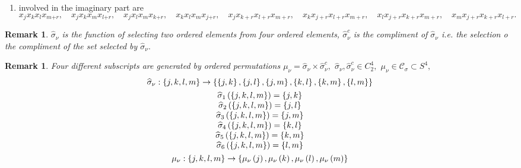 \documentclass[aps,preprint]{revtex4}%
\newtheorem{remark}[theorem]{Remark}
\begin{document}
\begin{enumerate}
\item involved in the imaginary part are%
\begin{equation}
x_{j}x_{k}x_{l}x_{m\boldsymbol{+}r},\quad x_{j}x_{k}x_{m}x_{l\boldsymbol{+}%
r},\quad x_{j}x_{l}x_{m}x_{k\boldsymbol{+}r},\quad x_{k}x_{l}x_{m}%
x_{j\boldsymbol{+}r},\quad x_{j}x_{k+r}x_{l+r}x_{m+r},\quad x_{k}%
x_{j+r}x_{l+r}x_{m+r},\quad x_{l}x_{j+r}x_{k+r}x_{m+r},\quad x_{m}%
x_{j+r}x_{k+r}x_{l+r}.
\end{equation}

\end{enumerate}

\begin{remark}
$\widehat{\sigma}_{\nu}$ is the function of selecting two ordered elements
from four ordered elements, $\widehat{\sigma}_{\nu}^{c}$ is the compliment of
$\widehat{\sigma}_{\nu}$ i.e. the selection o the compliment of the set
selected by $\widehat{\sigma}_{\nu}.$
\end{remark}

\begin{remark}
\newline Four different subscripts are generated by ordered permutations
$\mu_{\nu}=\widehat{\sigma}_{\nu}\times\widehat{\sigma}_{\nu}^{c},$
$\widehat{\sigma}_{\nu},\widehat{\sigma}_{\nu}^{c}\in C_{2}^{4},$ $\mu_{\nu
}\in\mathcal{C}_{\sigma}\subset S^{4},$%
\begin{gather}
\widehat{\sigma}_{\nu}:\left\{  j,k,l,m\right\}  \rightarrow\left\{  \left\{
j,k\right\}  ,\left\{  j,l\right\}  ,\left\{  j,m\right\}  ,\left\{
k,l\right\}  ,\left\{  k,m\right\}  ,\left\{  l,m\right\}  \right\} \\%
\begin{array}
[c]{c}%
\widehat{\sigma}_{1}\left(  \left\{  j,k,l,m\right\}  \right)  =\left\{
j,k\right\} \\
\widehat{\sigma}_{2}\left(  \left\{  j,k,l,m\right\}  \right)  =\left\{
j,l\right\} \\
\widehat{\sigma}_{3}\left(  \left\{  j,k,l,m\right\}  \right)  =\left\{
j,m\right\} \\
\widehat{\sigma}_{4}\left(  \left\{  j,k,l,m\right\}  \right)  =\left\{
k,l\right\} \\
\widehat{\sigma}_{5}\left(  \left\{  j,k,l,m\right\}  \right)  =\left\{
k,m\right\} \\
\widehat{\sigma}_{6}\left(  \left\{  j,k,l,m\right\}  \right)  =\left\{
l,m\right\}
\end{array}
\\
\mu_{\nu}:\left\{  j,k,l,m\right\}  \rightarrow\left\{  \mu_{\nu}\left(
j\right)  ,\mu_{\nu}\left(  k\right)  ,\mu_{\nu}\left(  l\right)  ,\mu_{\nu
}\left(  m\right)  \right\}
\end{gather}

\end{remark}
\end{document}
